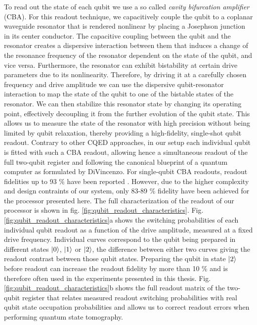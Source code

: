 To read out the state of each qubit we use a so called {\it cavity bifurcation amplifier} (CBA). For this readout technique, we capacitively couple the qubit to a coplanar waveguide resonator that is rendered nonlinear by placing a Josephson junction in its center conductor. The capacitive coupling between the qubit and the resonator creates a dispersive interaction between them that induces a change of the resonance frequency of the resonator dependent on the state of the qubit, and vice versa. Furthermore, the resonator can exhibit bistability at certain drive parameters due to its nonlinearity. Therefore, by driving it at a carefully chosen frequency and drive amplitude we can use the dispersive qubit-resonator interaction to map the state of the qubit to one of the bistable states of the resonator. We can then stabilize this resonator state by changing its operating point, effectively decoupling it from the further evolution of the qubit state. This allows us to measure the state of the resonator with high precision without being limited by qubit relaxation, thereby providing a high-fidelity, single-shot qubit readout. Contrary to other CQED approaches, in our setup each individual qubit is fitted with such a CBA readout, allowing hence a simultaneous readout of the full two-qubit register and following the canonical blueprint of a quantum computer as formulated by DiVincenzo. For single-qubit CBA readouts, readout fidelities up to 93 \% have been reported \citep{mallet_single-shot_2009}. However, due to the higher complexity and design contraints of our system, only  83-89 \% fidelity have been achieved for the processor presented here. The full characterization of the readout of our processor is shown in fig. \ref{fig:qubit_readout_characteristics}. Fig. \ref{fig:qubit_readout_characteristics}a shows the switching probabilities of each individual qubit readout as a function of the drive amplitude, measured at a fixed drive frequency. Individual curves correspond to the qubit being prepared in different states $\left| 0 \right>$, $\left| 1 \right>$ or $\left| 2 \right>$, the difference between either two curves giving the readout contrast between those qubit states. Preparing the qubit in state $\left| 2 \right>$ before readout can increase the readout fidelity by more than 10 \% and is therefore often used in the experiments presented in this thesis. Fig. \ref{fig:qubit_readout_characteristics}b shows the full readout matrix of the two-qubit register that relates measured readout switching probabilities with real qubit state occupation probabilities and allows us to correct readout errors when performing quantum state tomography.

